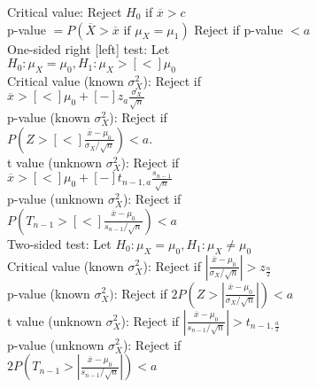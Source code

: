 \documentclass{article}
\begin{document}
\begin{figure}[h!]
\begin{subfigure}[h!]{0.49\textwidth}
        Critical value: Reject $H_{0}$ if $\overline{x}>c$\\
        p-value $=P(\overline{X}>\overline{x}\text{ if }\mu_{X}=\mu_{1})$ \quad Reject if p-value $<a$\\
        One-sided right [left] test: Let $H_{0}:\mu_{X}=\mu_{0},H_{1}:\mu_{X}>[<]\mu_{0}$\\
        Critical value (known $\sigma_{X}^{2}$): Reject if $\overline{x}>[<]\mu_{0}+[-]z_{a}\frac{\sigma_{X}}{\sqrt{n}}$\\
        p-value (known $\sigma_{X}^{2}$): Reject if $P(Z>[<]\frac{\overline{x}-\mu_{0}}{\sigma_{X}/\sqrt{n}})<a$.\\
        t value (unknown $\sigma_{X}^{2}$): Reject if $\overline{x}>[<]\mu_{0}+[-]t_{n-1,a}\frac{s_{n-1}}{\sqrt{n}}$\\
        p-value (unknown $\sigma_{X}^{2}$): Reject if $P(T_{n-1}>[<]\frac{\overline{x}-\mu_{0}}{s_{n-1}/\sqrt{n}})<a$\\
        Two-sided test: Let $H_{0}:\mu_{X}=\mu_{0},H_{1}:\mu_{X}\neq\mu_{0}$\\
        Critical value (known $\sigma_{X}^{2}$): Reject if $\left|\frac{\overline{x}-\mu_{0}}{\sigma_{X}/\sqrt{n}}\right|>z_{\frac{\alpha}{2}}$\\
        p-value (known $\sigma_{X}^{2})$: Reject if $2P(Z>\left|\frac{\overline{x}-\mu_{0}}{\sigma_{X}/\sqrt{n}}\right|)<a$\\
        t value (unknown $\sigma_{X}^{2}$): Reject if $\left|\frac{\overline{x}-\mu_{0}}{s_{n-1}/\sqrt{n}}\right|>t_{n-1,\frac{a}{2}}$\\
        p-value (unknown $\sigma_{X}^{2}$): Reject if $2P(T_{n-1}>\left|\frac{\overline{x}-\mu_{0}}{s_{n-1}/\sqrt{n}}\right|)<a$\\
    \end{subfigure}
\end{figure}
\end{document}
